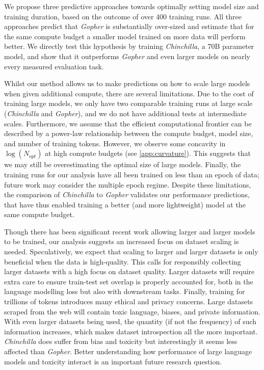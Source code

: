 \documentclass[11pt, a4paper, logo, copyright, nonumbering]{deepmind}
\newcommand{\gopher}{\textit{Gopher}\xspace}
\newcommand{\nummodels}{400 }
\newcommand{\chinchilla}{\textit{Chinchilla}\xspace}
\begin{document}
We propose three predictive approaches towards optimally setting model size and training duration, based on the outcome of over \nummodels training runs.
All three approaches predict that \gopher is substantially over-sized and estimate that for the same compute budget a smaller model trained on more data will perform better.
We directly test this hypothesis by training \chinchilla, a 70B parameter model, and show that it outperforms \gopher and even larger models on nearly every measured evaluation task.

Whilst our method allows us to make predictions on how to scale large models when given additional compute, there are several limitations.
Due to the cost of training large models, we only have two comparable training runs at large scale (\chinchilla and \gopher), and we do not have additional tests at intermediate scales. 
Furthermore, we assume that the efficient computational frontier can be described by a power-law relationship between the compute budget, model size, and number of training tokens.
However, we observe some concavity in $\log \left (N_{opt} \right)$ at high compute budgets (see \autoref{app:curvature}).
This suggests that we may still be overestimating the optimal size of large models.
Finally, the training runs for our analysis have all been trained on less than an epoch of data; future work may consider the multiple epoch regime.
Despite these limitations, the comparison of \chinchilla to \gopher validates our performance predictions, that have thus enabled training a better (and more lightweight) model at the same compute budget.
 
Though there has been significant recent work allowing larger and larger models to be trained, our analysis suggests an increased focus on dataset scaling is needed.
Speculatively, we expect that scaling to larger and larger datasets is only beneficial when the data is high-quality.
This calls for responsibly collecting larger datasets with a high focus on dataset quality.
Larger datasets will require extra care to ensure train-test set overlap is properly accounted for, both in the language modelling loss but also with downstream tasks.
Finally, training for trillions of tokens introduces many ethical and privacy concerns.
Large datasets scraped from the web will contain toxic language, biases, and private information.
With even larger datasets being used, the quantity (if not the frequency) of such information increases, which makes dataset introspection all the more important.
\chinchilla does suffer from bias and toxicity but interestingly it seems less affected than \gopher. 
Better understanding how performance of large language models and toxicity interact is an important future research question.
\end{document}
